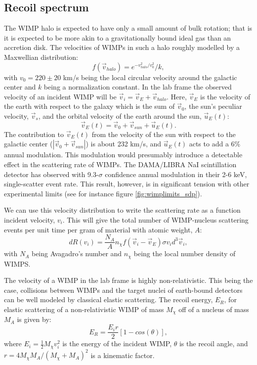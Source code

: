 \subsection{Recoil spectrum}
The WIMP halo is expected to have only a small amount of bulk rotation; that is it is expected to be more akin to a gravitationally bound ideal gas than an accretion disk. The velocities of WIMPs in such a halo roughly modelled by a Maxwellian distribution\cite{dmintro}:
\begin{equation}\label{eq:veldist}
f(\vec{v}_{halo})= e^{-v_{halo}^2/v_0^2}/k,
\end{equation}
with $v_0=220\pm 20$ km/s being the local circular velocity around the galactic center and $k$ being a normalization constant. In the lab frame the observed velocity of an incident WIMP will be $\vec{v}_i=\vec{v}_E+\vec{v}_{halo}$. Here, $\vec{v}_E$ is the velocity of the earth with respect to the galaxy which is the sum of $\vec{v}_0$, the sun's peculiar velocity, $\vec{v}_s$, and the orbital velocity of the earth around the sun, $\vec{u}_E(t)$\cite{dmvelocity,dmintro}:
\begin{equation}
\vec{v}_E(t)=\vec{v}_0+\vec{v}_{sun}+\vec{u}_E(t).
\end{equation}
The contribution  to $\vec{v}_E(t)$ from the velocity of the sun with respect to the galactic center ($|\vec{v}_0+\vec{v}_{sun}|$) is about 232 km/s, and $\vec{u}_E(t)$ acts to add a 6\% annual modulation. This modulation would presumably introduce a detectable effect in the scattering rate of WIMPs. The DAMA/LIBRA NaI scintillation detector\cite{dama} has observed with 9.3-$\sigma$ confidence annual modulation in their 2-6 keV, single-scatter event rate. This result, however, is in significant tension with other experimental limits (see for instance figure \ref{fig:wimplimits_sdp}).

We can use this velocity distribution to write the scattering rate as a function incident velocity, $v_i$. This will give the total number of WIMP-nucleus scattering events per unit time per gram of material with atomic weight, $A$:
\begin{equation}
dR(v_i)=\frac{N_A}{A}n_{\chi}f(\vec{v}_i-\vec{v}_E)\sigma v_i d^3\vec{v}_i,
\end{equation}
with $N_A$ being Avagadro's number and $n_{\chi}$ being the local number density of WIMPS.

The velocity of a WIMP in the lab frame is highly non-relativistic. This being the case, collisions between WIMPs and the target nuclei of earth-bound detectors can be well modeled by classical elastic scattering. The recoil energy, $E_R$, for elastic scattering of a non-relativistic WIMP of mass $M_{\chi}$ off of a nucleus of mass $M_A$ is given by\cite{dmintro}:
\begin{equation}\label{eq:recoilE}
E_R=\frac{E_ir}{2}[1-cos(\theta)],
\end{equation}
where $E_i=\frac{1}{2}M_{\chi}v_i^2$ is the energy of the incident WIMP, $\theta$ is the recoil angle, and $r=4M_{\chi}M_{A}/(M_{\chi}+M_{A})^2$ is a kinematic factor. 

